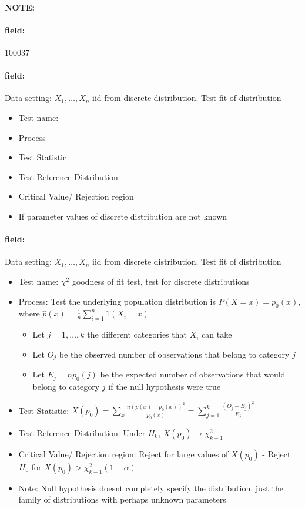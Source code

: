 \documentclass[12pt]{article}
\newenvironment{note}{\paragraph{NOTE:}}{}
\newenvironment{field}{\paragraph{field:}}{}
\begin{document}
\begin{note} \begin{field} \tiny 100037 \end{field}
 \begin{field}
  Data setting: $X_1, \ldots , X_n$ iid from discrete distribution. Test fit of distribution
  \begin{itemize}
   \item Test name:
   \item Process
   \item Test Statistic
   \item Test Reference Distribution
   \item Critical Value/ Rejection region
   \item If parameter values of discrete distribution are not known
  \end{itemize}
 \end{field}
 \begin{field}
  Data setting: $X_1, \ldots , X_n$ iid from discrete distribution. Test fit of distribution
  \begin{itemize}
   \item Test name: $\chi^2$ goodness of fit test, test for discrete distributions
   \item Process: Test the underlying population distribution is $P(X = x) = p_0(x)$, where $\hat{p}(x) = \frac{1}{n} \sum_{i=1}^n 1(X_i = x)$
         \begin{itemize}
          \item Let $j = 1, \ldots, k$ the different categories that $X_i$ can take
          \item Let $O_j$ be the observed number of observations that belong to category $j$
          \item Let $E_j = np_0(j)$ be the expected number of observations that would belong to category $j$ if the null hypothesis were true
         \end{itemize}
   \item Test Statistic: $X(p_0) = \sum_x\frac{n(\hat{p}(x) - p_0(x))^2}{p_0(x)} = \sum_{j=1}^k \frac{(O_j - E_j)^2}{E_j}$
   \item Test Reference Distribution: Under $H_0$, $X(p_0) \to \chi_{k-1}^2$
   \item Critical Value/ Rejection region: Reject for large values of $X(p_0)$ - Reject $H_0$ for $X(p_0) > \chi_{k-1}^2(1-\alpha)$
   \item Note: Null hypothesis doesnt completely specify the distribution, just the family of distributions with perhaps unknown parameters

\end{itemize}
\end{field}
\end{note}
\end{document}

